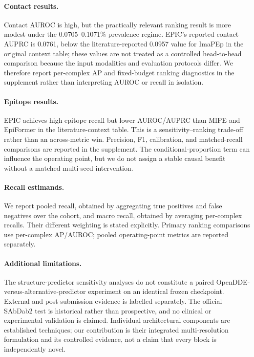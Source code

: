 \paragraph{Contact results.}
Contact AUROC is high, but the practically relevant ranking result is more modest under the 0.0705--0.1071\% prevalence regime. EPIC's reported contact AUPRC is 0.0761, below the literature-reported 0.0957 value for ImaPEp in the original context table; these values are not treated as a controlled head-to-head comparison because the input modalities and evaluation protocols differ. We therefore report per-complex AP and fixed-budget ranking diagnostics in the supplement rather than interpreting AUROC or recall in isolation.

\paragraph{Epitope results.}
EPIC achieves high epitope recall but lower AUROC/AUPRC than MIPE and EpiFormer in the literature-context table. This is a sensitivity--ranking trade-off rather than an across-metric win. Precision, F1, calibration, and matched-recall comparisons are reported in the supplement. The conditional-proportion term can influence the operating point, but we do not assign a stable causal benefit without a matched multi-seed intervention.

\caption{Literature-context numbers are reproduced from cited sources or benchmark reports and may differ in structure authority, split construction, candidate masks, per-complex versus pooled aggregation, and threshold selection. Boldface is not used to imply a controlled head-to-head comparison. Same-protocol internal measurements are reported separately.}

\paragraph{Recall estimands.}
We report pooled recall, obtained by aggregating true positives and false negatives over the cohort, and macro recall, obtained by averaging per-complex recalls. Their different weighting is stated explicitly. Primary ranking comparisons use per-complex AP/AUROC; pooled operating-point metrics are reported separately.

\paragraph{Additional limitations.}
The structure-predictor sensitivity analyses do not constitute a paired OpenDDE-versus-alternative-predictor experiment on an identical frozen checkpoint. External and post-submission evidence is labelled separately. The official SAbDab2 test is historical rather than prospective, and no clinical or experimental validation is claimed. Individual architectural components are established techniques; our contribution is their integrated multi-resolution formulation and its controlled evidence, not a claim that every block is independently novel.
